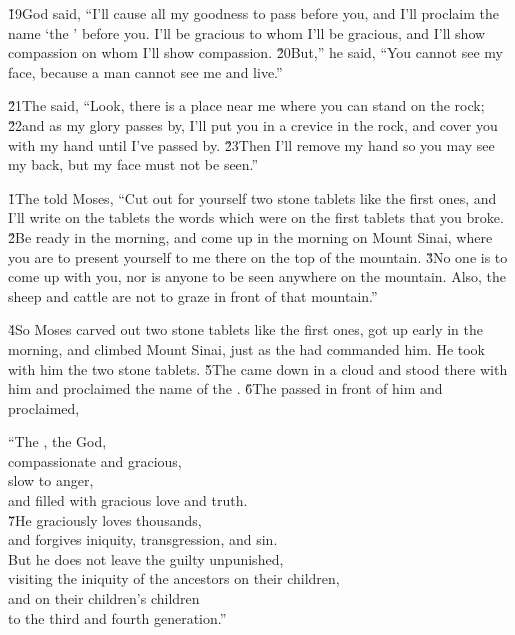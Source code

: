 \v{19}God said, ``I'll cause all my goodness to pass before you, and I'll proclaim the name `the ' before you. I'll be gracious to whom I'll be gracious, and I'll show compassion on whom I'll show compassion. \v{20}But,'' he said, ``You cannot see my face, because a man cannot see me and live.''

\v{21}The  said, ``Look, there is a place near me where you can stand on the rock; \v{22}and as my glory passes by, I'll put you in a crevice in the rock, and cover you with my hand until I've passed by. \v{23}Then I'll remove my hand so you may see my back, but my face must not be seen.''

\v{1}The  told Moses, ``Cut out for yourself two stone tablets like the first ones, and I'll write on the tablets the words which were on the first tablets that you broke. \v{2}Be ready in the morning, and come up in the morning on Mount Sinai, where you are to present yourself to me there on the top of the mountain. \v{3}No one is to come up with you, nor is anyone to be seen anywhere on the mountain. Also, the sheep and cattle are not to graze in front of that mountain.''

\v{4}So Moses carved out two stone tablets like the first ones, got up early in the morning, and climbed Mount Sinai, just as the  had commanded him. He took with him the two stone tablets. \v{5}The  came down in a cloud and stood there with him and proclaimed the name of the . \v{6}The  passed in front of him and proclaimed,

\begin{poetry}
\poeml ``The , the  God, \\
\poemll    compassionate and gracious, \\
\poeml slow to anger, \\
\poemll    and filled with gracious love and truth. \\
\poeml \v{7}He graciously loves thousands, \\
\poemll    and forgives iniquity, transgression, and sin. \\
\poeml But he does not leave the guilty unpunished, \\
\poemll    visiting the iniquity of the ancestors on their children, \\
\poeml and on their children's children \\
\poemll    to the third and fourth generation.''
\end{poetry}

